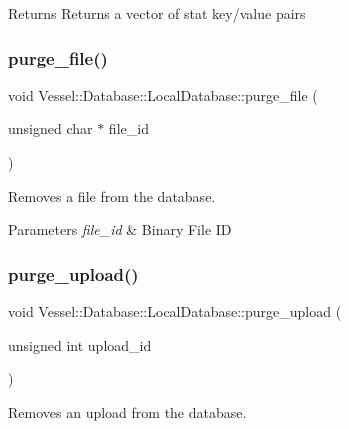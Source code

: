 \begin{DoxyReturn}{Returns}
Returns a vector of stat key/value pairs 
\end{DoxyReturn}
\mbox{\label{class_vessel_1_1_database_1_1_local_database_ab6315c29e00efda7ac808f68a054f0ea}} 
\subsubsection{\texorpdfstring{purge\+\_\+file()}{purge\_file()}}
{\footnotesize\ttfamily void Vessel\+::\+Database\+::\+Local\+Database\+::purge\+\_\+file (\begin{DoxyParamCaption}\item[{unsigned char $\ast$}]{file\+\_\+id }\end{DoxyParamCaption})}



Removes a file from the database. 


\begin{DoxyParams}{Parameters}
{\em file\+\_\+id} & Binary File ID \\
\hline
\end{DoxyParams}
\mbox{\label{class_vessel_1_1_database_1_1_local_database_a328b2ea5ed242bacc70ea6bf248bf44d}} 
\subsubsection{\texorpdfstring{purge\+\_\+upload()}{purge\_upload()}}
{\footnotesize\ttfamily void Vessel\+::\+Database\+::\+Local\+Database\+::purge\+\_\+upload (\begin{DoxyParamCaption}\item[{unsigned int}]{upload\+\_\+id }\end{DoxyParamCaption})}



Removes an upload from the database. 


